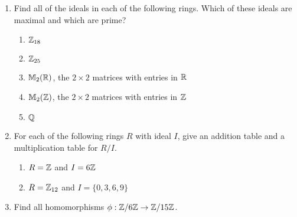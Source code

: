 {\begin{enumerate}
\begin{enumerate}
 \bf\item\rm
${\Bbb Z}_{10}$
 
 \bf\item\rm
${\Bbb Z}_{12}$
 
 \bf\item\rm
${\Bbb Z}_{7}$
 
 \bf\item\rm
${\Bbb M}_2( {\Bbb Z} )$, the $2 \times 2$ matrices with entries in
${\Bbb Z}$ 
 
 \bf\item\rm
${\Bbb M}_2( {\Bbb Z}_2 )$, the $2 \times 2$ matrices with entries in
${\Bbb Z}_2$  
\end{enumerate}
 
 
\bf\item\rm
Find all of the ideals in each of the following rings.  Which of these
ideals are maximal and which are prime?
\begin{enumerate}
 
 \bf\item\rm
${\Bbb Z}_{18}$
 
 \bf\item\rm
${\Bbb Z}_{25}$
 
 \bf\item\rm
${\Bbb M}_2( {\Bbb R} )$, the $2 \times 2$ matrices with entries in
${\Bbb R}$ 
 
 \bf\item\rm
${\Bbb M}_2( {\Bbb Z} )$, the $2 \times 2$ matrices with entries in
${\Bbb Z}$ 
 
 \bf\item\rm
${\Bbb Q}$
 
\end{enumerate}
 
 
\bf\item\rm
For each of the following rings $R$ with ideal $I$, give an addition
table and a multiplication table for $R/I$. 
\begin{enumerate}
 
 \bf\item\rm
$R = {\Bbb Z}$ and $I = 6 {\Bbb Z}$
 
 \bf\item\rm
$R = {\Bbb Z}_{12}$ and $I = \{ 0, 3, 6, 9 \}$
 
\end{enumerate}
 
 
\bf\item\rm
Find all homomorphisms $\phi : {\Bbb Z} / 6 {\Bbb Z} \rightarrow {\Bbb
Z} / 15 {\Bbb Z}$. 
 

\end{enumerate}}
